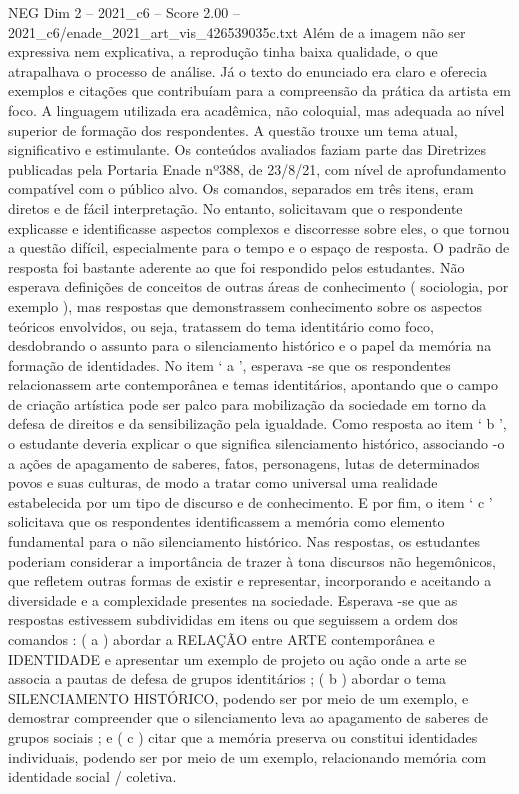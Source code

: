 \begin{textsample}{NEG Dim 2 – 2021\_c6 – Score 2.00 – 2021\_c6/enade\_2021\_art\_vis\_426539035c.txt}
Além de a imagem não ser expressiva nem explicativa, a reprodução tinha baixa qualidade, o que atrapalhava o processo de análise.
Já o texto do enunciado era claro e oferecia exemplos e citações que contribuíam para a compreensão da prática da artista em foco.
A linguagem utilizada era acadêmica, não coloquial, mas adequada ao nível superior de formação dos respondentes.
A questão trouxe um tema atual, significativo e estimulante.
Os conteúdos avaliados faziam parte das Diretrizes publicadas pela Portaria Enade nº388, de 23/8/21, com nível de aprofundamento compatível com o público alvo.
Os comandos, separados em três itens, eram diretos e de fácil interpretação.
No entanto, solicitavam que o respondente explicasse e identificasse aspectos complexos e discorresse sobre eles, o que tornou a questão difícil, especialmente para o tempo e o espaço de resposta.
O padrão de resposta foi bastante aderente ao que foi respondido pelos estudantes.
Não esperava definições de conceitos de outras áreas de conhecimento ( sociologia, por exemplo ), mas respostas que demonstrassem conhecimento sobre os aspectos teóricos envolvidos, ou seja, tratassem do tema identitário como foco, desdobrando o assunto para o silenciamento histórico e o papel da memória na formação de identidades.
No item ‘ a ’, esperava -se que os respondentes relacionassem arte contemporânea e temas identitários, apontando que o campo de criação artística pode ser palco para mobilização da sociedade em torno da defesa de direitos e da sensibilização pela igualdade.
Como resposta ao item ‘ b ’, o estudante deveria explicar o que significa silenciamento histórico, associando -o a ações de apagamento de saberes, fatos, personagens, lutas de determinados povos e suas culturas, de modo a tratar como universal uma realidade estabelecida por um tipo de discurso e de conhecimento.
E por fim, o item ‘ c ’ solicitava que os respondentes identificassem a memória como elemento fundamental para o não silenciamento histórico.
Nas respostas, os estudantes poderiam considerar a importância de trazer à tona discursos não hegemônicos, que refletem outras formas de existir e representar, incorporando e aceitando a diversidade e a complexidade presentes na sociedade.
Esperava -se que as respostas estivessem subdivididas em itens ou que seguissem a ordem dos comandos : ( a ) abordar a RELAÇÃO entre ARTE contemporânea e IDENTIDADE e apresentar um exemplo de projeto ou ação onde a arte se associa a pautas de defesa de grupos identitários ; ( b ) abordar o tema SILENCIAMENTO HISTÓRICO, podendo ser por meio de um exemplo, e demostrar compreender que o silenciamento leva ao apagamento de saberes de grupos sociais ; e ( c ) citar que a memória preserva ou constitui identidades individuais, podendo ser por meio de um exemplo, relacionando memória com identidade social / coletiva.

\end{textsample}
